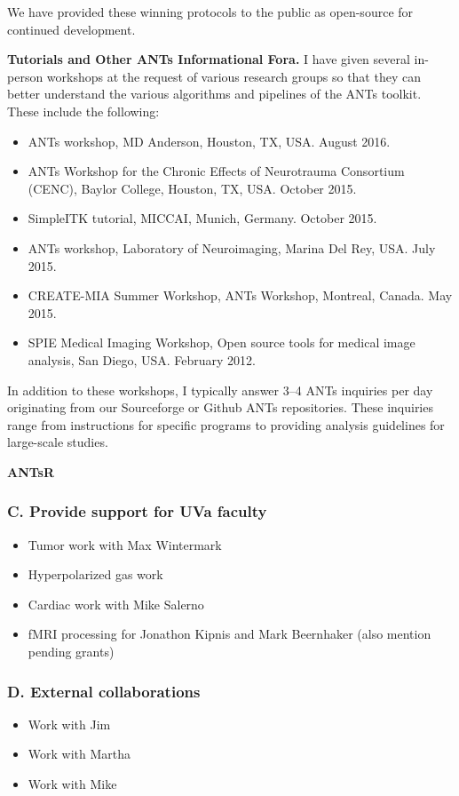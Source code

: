 \documentclass[11pt,]{article}
\begin{document}
We have provided these winning protocols to the public as open-source
for continued development.

\textbf{Tutorials and Other ANTs Informational Fora.} I have given
several in-person workshops at the request of various research groups so
that they can better understand the various algorithms and pipelines of
the ANTs toolkit. These include the following:

\begin{itemize}
\item
  ANTs workshop, MD Anderson, Houston, TX, USA. August 2016.
\item
  ANTs Workshop for the Chronic Effects of Neurotrauma Consortium
  (CENC), Baylor College, Houston, TX, USA. October 2015.
\item
  SimpleITK tutorial, MICCAI, Munich, Germany. October 2015.
\item
  ANTs workshop, Laboratory of Neuroimaging, Marina Del Rey, USA. July
  2015.
\item
  CREATE-MIA Summer Workshop, ANTs Workshop, Montreal, Canada. May 2015.
\item
  SPIE Medical Imaging Workshop, Open source tools for medical image
  analysis, San Diego, USA. February 2012.
\end{itemize}

In addition to these workshops, I typically answer 3--4 ANTs inquiries
per day originating from our Sourceforge or Github ANTs repositories.
These inquiries range from instructions for specific programs to
providing analysis guidelines for large-scale studies.

\textbf{ANTsR}

\subsubsection{C. Provide support for UVa
faculty}\label{c.-provide-support-for-uva-faculty}

\begin{itemize}
\item
  Tumor work with Max Wintermark
\item
  Hyperpolarized gas work
\item
  Cardiac work with Mike Salerno
\item
  fMRI processing for Jonathon Kipnis and Mark Beernhaker (also mention
  pending grants)
\end{itemize}

\subsubsection{D. External
collaborations}\label{d.-external-collaborations}

\begin{itemize}
\item
  Work with Jim
\item
  Work with Martha
\item
  Work with Mike
\end{itemize}
\end{document}
